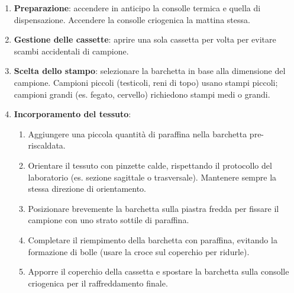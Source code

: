 \begin{enumerate}
  \item \textbf{Preparazione}: accendere in anticipo la consolle termica e quella di dispensazione. Accendere la consolle criogenica la mattina stessa.

  \item \textbf{Gestione delle cassette}: aprire una sola cassetta per volta per evitare scambi accidentali di campione.

  \item \textbf{Scelta dello stampo}: selezionare la barchetta in base alla dimensione del campione. Campioni piccoli (testicoli, reni di topo) usano stampi piccoli; campioni grandi (es. fegato, cervello) richiedono stampi medi o grandi.

  \item \textbf{Incorporamento del tessuto}:
  \begin{enumerate}
    \item Aggiungere una piccola quantità di paraffina nella barchetta pre-riscaldata.
    \item Orientare il tessuto con pinzette calde, rispettando il protocollo del laboratorio (es. sezione sagittale o trasversale). Mantenere sempre la stessa direzione di orientamento.
    
    
    \item Posizionare brevemente la barchetta sulla piastra fredda per fissare il campione con uno strato sottile di paraffina.
    \item Completare il riempimento della barchetta con paraffina, evitando la formazione di bolle (usare la croce sul coperchio per ridurle).
    \item Apporre il coperchio della cassetta e spostare la barchetta sulla consolle criogenica per il raffreddamento finale.
    


\end{enumerate}
\end{enumerate}

